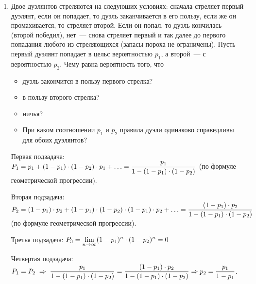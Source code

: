 \documentclass{article}
\begin{document}
\begin{enumerate}
    $P(A_2) = P(B_1) \cdot P(B_2) \cdot (1 - P(B_1)) + P(B_1) \cdot P(B_2) \cdot P(B_1) + (1 - P(B_1)) \cdot P(B_2) \cdot P(B_1) + P(B_1) \cdot (1 - P(B_2)) \cdot P(B_1)$.

    $P(A_1) - P(A_2) = -2 \cdot P(B_1) \cdot P(B_2) + P(B_2) - P(B_1) + 2 \cdot P(B_2) \cdot P(B_1) = (P(B_2) - P(B_1)) \cdot (P(B_1) + P(B_2) - 2 P(B_1) \cdot P(B_2)) < 0$ \rightarrow $A_2$ выгоднее.

    \answer{}

    \begin{itemize}
        \item $A_1$ выгоднее
        \item $A_2$ выгоднее.
    \end{itemize}


    \item Двое дуэлянтов стреляются на следуюших условиях: сначала стреляет первый дуэлянт, если он попадает, то дуэль заканчивается в его пользу, если же он промахивается, то стреляет второй. Если он попал, то дуэль кончилась (второй победил), нет~--- снова стреляет первый и так далее до первого попадания любого из стреляющихся (запасы пороха не ограничены). Пусть первый дуэлянт попадает в цельс  вероятностью $p_1$, а второй~--- с вероятностью $p_2$. Чему равна вероятность того, что 
    \begin{itemize}
        \item дуэль закончится в пользу первого стрелка?
        \item в пользу второго стрелка?
        \item ничья?
        \item При каком соотношении $p_1$ и $p_2$ правила дуэли одинаково справедливы для обоих дуэлянтов?
    \end{itemize}

    \solution{}

    Первая подзадача: $\displaystyle{P_1 = p_1 + (1 - p_1) \cdot (1 - p_2) \cdot p_1 + \ldots = \frac{p_1}{1 - (1 - p_1)\cdot(1 - p_2)}}$ (по формуле геометрической прогрессии).

    Вторая подзадача: $\displaystyle{P_2 = (1 - p_1) \cdot p_2 + (1 - p_1) \cdot (1 - p_2) \cdot (1 - p_1) \cdot p_2 + \ldots = \frac{(1 - p_1) \cdot p_2}{1 - (1 - p_1) \cdot (1 - p_2)}}$ (по формуле геометрической прогрессии).

    Третья подзадача: $\displaystyle{P_3 = \lim\limits_{n \rightarrow \infty}(1 - p_1)^n \cdot (1 - p_2) ^ n} = 0$

    Четвертая подзадача: $\displaystyle{P_1 = P_2 \; \Rightarrow \; \frac{p_1}{1 - (1 - p_1)\cdot(1 - p_2)} = \frac{(1 - p_1) \cdot p_2}{1 - (1 - p_1) \cdot (1 - p_2)} \Rightarrow p_2 = \frac{p_1}{1 - p_1}}$.


\end{enumerate}
\end{document}
